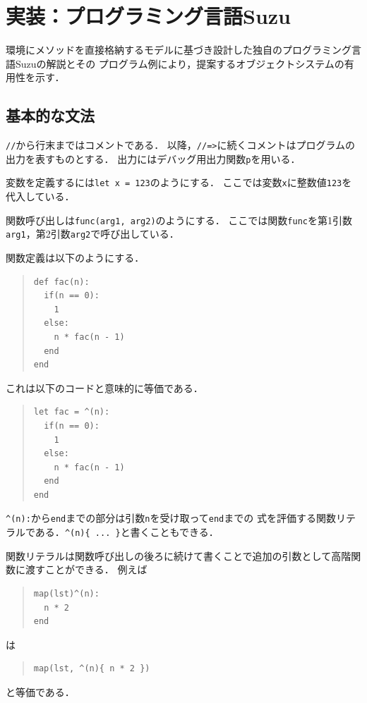 \documentclass{ipsjprosym}
\begin{document}
\section{実装：プログラミング言語Suzu}
\label{sec:implementation}

環境にメソッドを直接格納するモデルに基づき設計した独自のプログラミング言語Suzuの解説とその
プログラム例により，提案するオブジェクトシステムの有用性を示す．

\subsection{基本的な文法}

\verb|//|から行末まではコメントである．
以降，\verb|//=>|に続くコメントはプログラムの出力を表すものとする．
出力にはデバッグ用出力関数\verb|p|を用いる．

変数を定義するには\verb|let x = 123|のようにする．
ここでは変数\verb|x|に整数値\verb|123|を代入している．

関数呼び出しは\verb|func(arg1, arg2)|のようにする．
ここでは関数\verb|func|を第1引数\verb|arg1|，第2引数\verb|arg2|で呼び出している．

関数定義は以下のようにする．
\begin{quote}
\begin{verbatim}
def fac(n):
  if(n == 0):
    1
  else:
    n * fac(n - 1)
  end
end
\end{verbatim}
\end{quote}
これは以下のコードと意味的に等価である．
\begin{quote}
\begin{verbatim}
let fac = ^(n):
  if(n == 0):
    1
  else:
    n * fac(n - 1)
  end
end
\end{verbatim}
\end{quote}
\verb|^(n):|から\verb|end|までの部分は引数\verb|n|を受け取って\verb|end|までの
式を評価する関数リテラルである．\verb|^(n){ ... }|と書くこともできる．

関数リテラルは関数呼び出しの後ろに続けて書くことで追加の引数として高階関数に渡すことができる．
例えば
\begin{quote}
\begin{verbatim}
map(lst)^(n):
  n * 2
end
\end{verbatim}
\end{quote}
は
\begin{quote}
\begin{verbatim}
map(lst, ^(n){ n * 2 })
\end{verbatim}
\end{quote}
と等価である．
\end{document}
